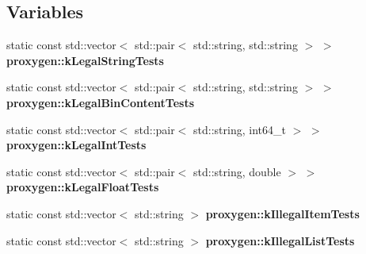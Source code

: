 \subsection*{Variables}
\begin{DoxyCompactItemize}
\item 
static const std\+::vector$<$ std\+::pair$<$ std\+::string, std\+::string $>$ $>$ {\bf proxygen\+::k\+Legal\+String\+Tests}
\item 
static const std\+::vector$<$ std\+::pair$<$ std\+::string, std\+::string $>$ $>$ {\bf proxygen\+::k\+Legal\+Bin\+Content\+Tests}
\item 
static const std\+::vector$<$ std\+::pair$<$ std\+::string, int64\+\_\+t $>$ $>$ {\bf proxygen\+::k\+Legal\+Int\+Tests}
\item 
static const std\+::vector$<$ std\+::pair$<$ std\+::string, double $>$ $>$ {\bf proxygen\+::k\+Legal\+Float\+Tests}
\item 
static const std\+::vector$<$ std\+::string $>$ {\bf proxygen\+::k\+Illegal\+Item\+Tests}
\item 
static const std\+::vector$<$ std\+::string $>$ {\bf proxygen\+::k\+Illegal\+List\+Tests}
\end{DoxyCompactItemize}
